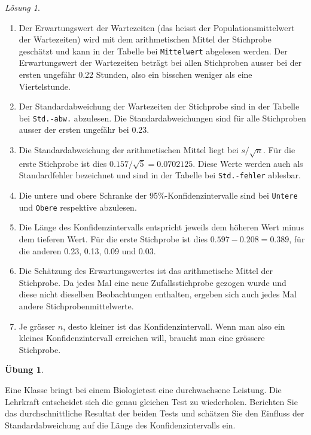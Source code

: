 \documentclass[
]{book}
\providecommand{\tightlist}{%
  \setlength{\itemsep}{0pt}\setlength{\parskip}{0pt}}
\theoremstyle{definition}
\theoremstyle{definition}
\theoremstyle{definition}
\newtheorem{exercise}{Übung}[chapter]
\theoremstyle{definition}
\theoremstyle{remark}
\newtheorem*{solution}{Lösung}
\begin{document}
\begin{solution}
\begin{enumerate}
\def\labelenumi{\alph{enumi}.}
\tightlist
\item
  Der Erwartungswert der Wartezeiten (das heisst der Populationsmittelwert der Wartezeiten) wird mit dem arithmetischen Mittel der Stichprobe geschätzt und kann in der Tabelle bei \texttt{Mittelwert} abgelesen werden. Der Erwartungswert der Wartezeiten beträgt bei allen Stichproben ausser bei der ersten ungefähr 0.22 Stunden, also ein bisschen weniger als eine Viertelstunde.
\item
  Der Standardabweichung der Wartezeiten der Stichprobe sind in der Tabelle bei \texttt{Std.-abw.} abzulesen. Die Standardabweichungen sind für alle Stichproben ausser der ersten ungefähr bei 0.23.
\item
  Die Standardabweichung der arithmetischen Mittel liegt bei \(s/\sqrt{n}\). Für die erste Stichprobe ist dies \(0.157 / \sqrt{5} = 0.0702125\). Diese Werte werden auch als Standardfehler bezeichnet und sind in der Tabelle bei \texttt{Std.-fehler} ablesbar.
\item
  Die untere und obere Schranke der 95\%-Konfidenzintervalle sind bei \texttt{Untere} und \texttt{Obere} respektive abzulesen.\\
\item
  Die Länge des Konfidenzintervalls entspricht jeweils dem höheren Wert minus dem tieferen Wert. Für die erste Stichprobe ist dies \(0.597 - 0.208 = 0.389\), für die anderen 0.23, 0.13, 0.09 und 0.03.
\item
  Die Schätzung des Erwartungswertes ist das arithmetische Mittel der Stichprobe. Da jedes Mal eine neue Zufallsstichprobe gezogen wurde und diese nicht dieselben Beobachtungen enthalten, ergeben sich auch jedes Mal andere Stichprobenmittelwerte.
\item
  Je grösser \(n\), desto kleiner ist das Konfidenzintervall. Wenn man also ein kleines Konfidenzintervall erreichen will, braucht man eine grössere Stichprobe.
\end{enumerate}

\end{solution}

\begin{exercise}
\protect\hypertarget{exr:biologietest}{}\label{exr:biologietest}\leavevmode

Eine Klasse bringt bei einem Biologietest eine durchwachsene Leistung. Die Lehrkraft entscheidet sich die genau gleichen Test zu wiederholen. Berichten Sie das durchschnittliche Resultat der beiden Tests und schätzen Sie den Einfluss der Standardabweichung auf die Länge des Konfidenzintervalls ein.

\end{exercise}
\end{document}
